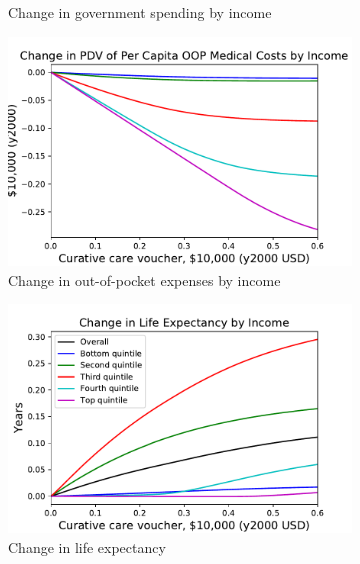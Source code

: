 \documentclass[12pt,pdftex,letterpaper]{article}
\begin{document}
\begin{figure}[h!]
\begin{subfigure}[b]{0.49\textwidth}
        \caption{Change in government spending by income}
    \end{subfigure}
    \begin{subfigure}[b]{0.49\textwidth}
        \centering
        \includegraphics[width=\textwidth]{../Figures/CurativeSubOOPchangeByInc.pdf}
        \caption{Change in out-of-pocket expenses by income}
    \end{subfigure}
    \begin{subfigure}[b]{0.49\textwidth}
        \centering
        \includegraphics[width=\textwidth]{../Figures/CurativeSubLifeExp.pdf}
        \caption{Change in life expectancy}
    \end{subfigure}
    \begin{subfigure}[b]{0.49\textwidth}
        \centering

\end{subfigure}
\end{figure}
\end{document}
